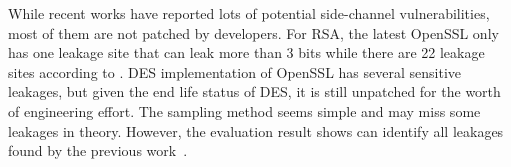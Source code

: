 While recent works have reported lots
of potential side-channel vulnerabilities, most of them are not patched by developers. For RSA, the latest OpenSSL only has one leakage site that can leak more than 3 bits while there are 22 leakage sites according to \tool{}. DES implementation of OpenSSL has several sensitive leakages, but given the end life status of DES, it is still unpatched for the worth of engineering effort. The sampling method  seems simple and may miss some leakages in theory. However, the evaluation result shows \tool{} can identify all leakages found by the previous work~\cite{203878,236338,Brotzman19Casym}.
